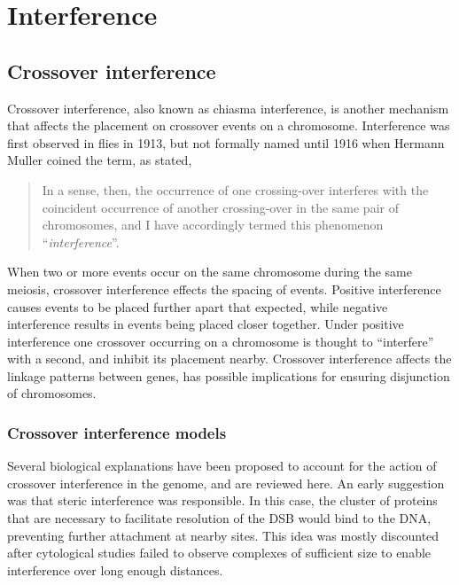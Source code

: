 \section{Interference}

\subsection{Crossover interference}

Crossover interference, also known as chiasma interference, is another mechanism that affects the placement on crossover events on a chromosome.
Interference was first observed in flies in 1913\cite{Sturtevant1913}, but not formally named until 1916 when Hermann Muller coined the term, as stated,
\begin{quote}
    In a sense, then, the occurrence of one crossing-over interferes with the coincident occurrence of another crossing-over in the same pair of chromosomes, and I have accordingly termed this phenomenon ``\textit{interference}''.
\end{quote}
%
When two or more events occur on the same chromosome during the same meiosis, crossover interference effects the spacing of events.
Positive interference causes events to be placed further apart that expected, while negative interference results in events being placed closer together.
Under positive interference one crossover occurring on a chromosome is thought to ``interfere'' with a second, and inhibit its placement nearby.
Crossover interference affects the linkage patterns between genes, has possible implications for ensuring disjunction of chromosomes.




\subsubsection{Crossover interference models}

Several biological explanations have been proposed to account for the action of crossover interference in the genome, and are reviewed here.
An early suggestion was that steric interference was responsible.
In this case, the cluster of proteins that are necessary to facilitate resolution of the DSB would bind to the DNA, preventing further attachment at nearby sites.
This idea was mostly discounted after cytological studies failed to observe complexes of sufficient size to enable interference over long enough distances.

